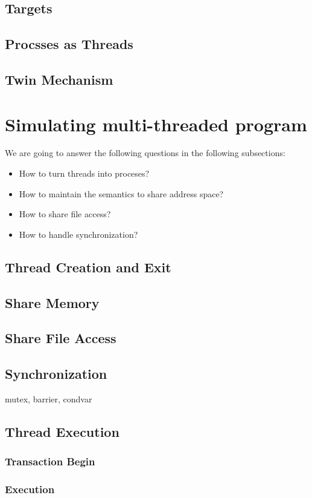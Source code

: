 \documentclass[10pt]{sigplanconf}
\begin{document}
\subsection{Targets}
\subsection{Procsses as Threads}
\subsection{Twin Mechanism}

\section{Simulating multi-threaded program}
We are going to answer the following questions in the following subsections:
\begin{itemize}
\item How to turn threads into proceses?
\item How to maintain the semantics to share address space?
\item How to share file access?
\item How to handle synchronization?
\end{itemize}

\subsection{Thread Creation and Exit}
\subsection{Share Memory}
\subsection{Share File Access}
\subsection{Synchronization}
mutex, barrier, condvar
\subsection{Thread Execution}
\subsubsection{Transaction Begin}
\subsubsection{Execution}
\end{document}
